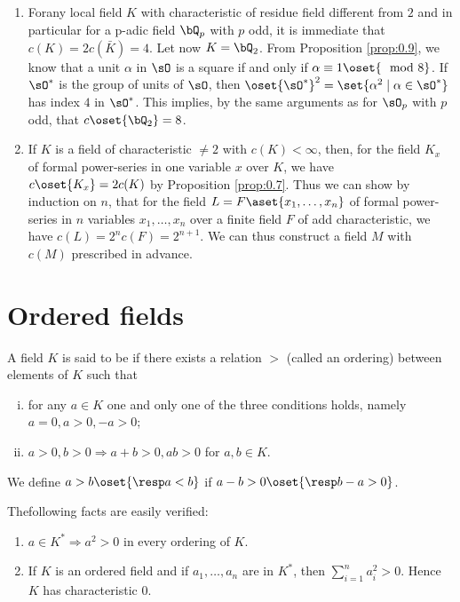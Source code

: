 \begin{remarks*}
\begin{enumerate}[(1).]
\item For\pageoriginale any local field $K$ with characteristic of residue field 
different from $2$ and in particular for a p-adic field $\bQ_p$ with 
$p$ odd, it is immediate that $c(K)=2c(\bar{K})=4$. Let now $K=\bQ_2$. 
From Proposition \ref{prop:0.9}, we know that a unit $\alpha$ in $\sO$ 
is a square if and only if $\alpha\equiv 1\oset{\mod 8}$. If $\sO^*$ 
is the group of units of $\sO$, then $\oset{\sO^*}^2=\set{\alpha^2\mid 
\alpha\in\sO^*}$ has index $4$ in $\sO^*$. This implies, by the same 
arguments as for $\sO_p$ with $p$ odd, that $c\oset{\bQ_2}=8$.
\item If $K$ is a field of characteristic $\neq 2$ with $c(K)<\infty$, 
then, for the field $K_x$ of formal power-series in one variable $x$ 
over $K$, we have $c\oset{K_x}=2c(K)$ by Proposition \ref{prop:0.7}. 
Thus we can show by induction on $n$, that for the field 
$L=F\aset{x_1,\ldots,x_n}$ of formal power-series in $n$ variables 
$x_1,\ldots,x_n$ over a finite field $F$ of add characteristic, we 
have $c(L)=2^nc(F)=2^{n+1}$. We can thus construct a field $M$ with 
$c(M)$ prescribed in advance.   
\end{enumerate}
\end{remarks*}

\section{Ordered fields}\label{sec0.8}
\begin{defi*}
A field $K$ is said to be  if there exists a relation $>$ 
(called an ordering) between elements of $K$ such that 
\begin{enumerate}[(i)]
\item for any $a\in K$ one and only one of the three conditions holds, 
namely $a=0,a>0, -a>0$;
\item $a>0, b>0\Rightarrow a+b>0, ab>0$ for $a,b\in K$.
\end{enumerate}

We define $a>b \oset{\resp a<b}$ if $a-b>0 \oset{\resp b-a>0}$. 
\end{defi*}

The\pageoriginale following facts are easily verified:
\begin{enumerate}[1)]
\item $a\in K^*\Rightarrow a^2>0$ in every ordering of $K$.
\item If $K$ is an ordered field and if $a_1,\ldots,a_n$ are in $K^*$, 
then $\sum\limits_{i=1}^{n} a_i^2>0$. Hence $K$ has characteristic $0$.
\end{enumerate}

